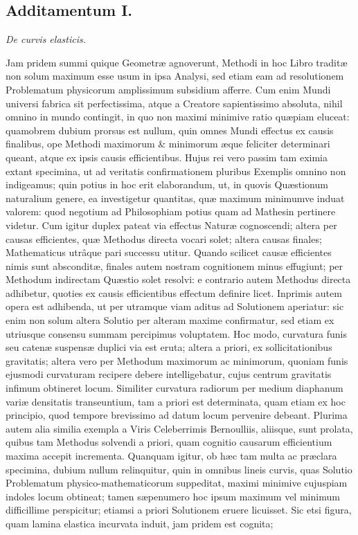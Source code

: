 \subsection*{Additamentum I.}
\begin{center}\textit{De curvis elasticis.}\end{center}
Jam pridem summi quique Geometræ agnoverunt, Methodi in hoc Libro traditæ non solum maximum esse usum in ipsa Analysi, sed etiam eam ad resolutionem Problematum physicorum amplissimum subsidium afferre. Cum enim Mundi universi fabrica sit perfectissima, atque a Creatore sapientissimo absoluta, nihil omnino in mundo contingit, in quo non maximi minimive ratio quæpiam eluceat: quamobrem dubium prorsus est nullum, quin omnes Mundi effectus ex causis finalibus, ope Methodi maximorum \& minimorum æque feliciter determinari queant, atque ex ipsis causis efficientibus. Hujus rei vero passim tam eximia extant specimina, ut ad veritatis confirmationem pluribus Exemplis omnino non indigeamus; quin potius in hoc erit elaborandum, ut, in quovis Quæstionum naturalium genere, ea investigetur quantitas, quæ maximum minimumve induat valorem: quod negotium ad Philosophiam potius quam ad Mathesin pertinere videtur. Cum igitur duplex pateat via effectus Naturæ cognoscendi; altera per causas efficientes, quæ Methodus directa vocari solet; altera causas finales; Mathematicus utrâque pari successu utitur. Quando scilicet causæ efficientes nimis sunt absconditæ, finales autem nostram cognitionem minus effugiunt; per Methodum indirectam Quæstio solet resolvi: e contrario autem Methodus directa adhibetur, quoties ex causis efficientibus effectum definire licet. Inprimis autem opera est adhibenda, ut per utramque viam aditus ad Solutionem aperiatur: sic enim non solum altera Solutio per alteram maxime confirmatur, sed etiam ex utriusque consensu summam percipimus voluptatem. Hoc modo, curvatura funis seu catenæ suspensæ duplici via est eruta; altera a priori, ex sollicitationibus gravitatis; altera vero per Methodum maximorum ac minimorum, quoniam funis ejusmodi curvaturam recipere debere intelligebatur, cujus centrum gravitatis infimum obtineret locum. Similiter curvatura radiorum per medium diaphanum variæ densitatis transeuntium, tam a priori est determinata, quam etiam ex hoc principio, quod tempore brevissimo ad datum locum pervenire debeant. Plurima autem alia similia exempla a Viris Celeberrimis Bernoulliis, aliisque, sunt prolata, quibus tam Methodus solvendi a priori, quam cognitio causarum efficientium maxima accepit incrementa. Quanquam igitur, ob hæc tam multa ac præclara specimina, dubium nullum relinquitur, quin in omnibus lineis curvis, quas Solutio Problematum physico-mathematicorum suppeditat, maximi minimive cujuspiam indoles locum obtineat; tamen sæpenumero hoc ipsum maximum vel minimum difficillime perspicitur; etiamsi a priori Solutionem eruere licuisset. Sic etsi figura, quam lamina elastica incurvata induit, jam pridem est cognita; 